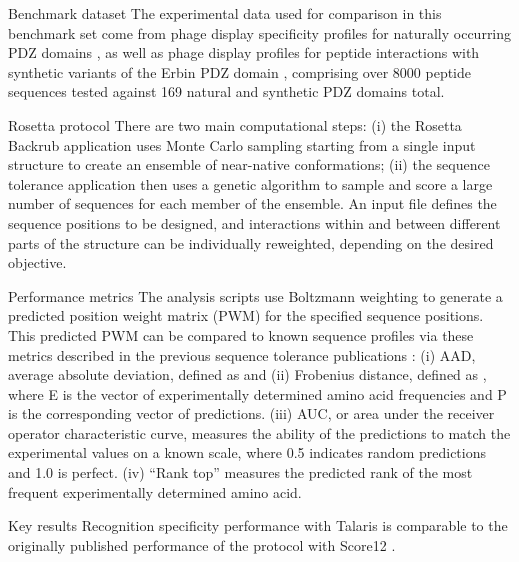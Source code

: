 Benchmark dataset
The experimental data used for comparison in this benchmark set come from phage display specificity profiles for naturally occurring PDZ domains \cite{tonikian_specificity_2008}, as well as phage display profiles for peptide interactions with synthetic variants of the Erbin PDZ domain \cite{tonikian_specificity_2008,ernst_rapid_2009}, comprising over 8000 peptide sequences tested against 169 natural and synthetic PDZ domains total.

Rosetta protocol
There are two main computational steps: (i) the Rosetta Backrub application \cite{smith_backrub-like_2008} uses Monte Carlo sampling starting from a single input structure to create an ensemble of near-native conformations; (ii) the sequence tolerance application \cite{smith_predicting_2011,smith_structure-based_2010} then uses a genetic algorithm to sample and score a large number of sequences for each member of the ensemble. An input file defines the sequence positions to be designed, and interactions within and between different parts of the structure can be individually reweighted, depending on the desired objective.

Performance metrics
The analysis scripts use Boltzmann weighting to generate a predicted position weight matrix (PWM) for the specified sequence positions. This predicted PWM can be compared to known sequence profiles via these metrics described in the previous sequence tolerance publications \cite{smith_predicting_2011,smith_structure-based_2010}: (i) AAD, average absolute deviation, defined as  and (ii) Frobenius distance, defined as , where E is the vector of experimentally determined amino acid frequencies and P is the corresponding vector of predictions. (iii) AUC, or area under the receiver operator characteristic curve, measures the ability of the predictions to match the experimental values on a known scale, where 0.5 indicates random predictions and 1.0 is perfect. (iv) “Rank top” measures the predicted rank of the most frequent experimentally determined amino acid.

Key results
Recognition specificity performance with Talaris is comparable to the originally published performance of the protocol with Score12 \cite{smith_predicting_2011,smith_structure-based_2010}.

